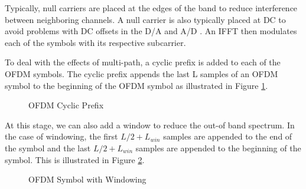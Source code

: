 \documentclass[conference]{IEEEtran}
\begin{document}
		Typically, null carriers are placed at the edges of the band to reduce interference between neighboring channels. A null carrier is also typically placed at DC to avoid problems with DC offsets in the D/A and A/D \cite{802_11a_standard}. An IFFT then modulates each of the symbols with its respective subcarrier.
		
		To deal with the effects of multi-path, a cyclic prefix is added to each of the OFDM symbols. The cyclic prefix appends the last L samples of an OFDM symbol to the beginning of the OFDM symbol as illustrated in Figure \ref{fig::cylic_prefix}.
		
		\begin{figure}[H]
	    		\centering
	    		\caption{OFDM Cyclic Prefix}
	    		\label{fig::cylic_prefix}
		\end{figure}
		
		At this stage, we can also add a window to reduce the out-of band spectrum. In the case of windowing, the first \newline $L/2 + L_{win}$ samples are appended to the end of the symbol and the last $L/2 + L_{win}$ samples are appended to the beginning of the symbol. This is illustrated in Figure \ref{fig::ofdm_windowing}.
		
		\begin{figure}[H]
	    		\centering
	    		\caption{OFDM Symbol with Windowing}
	    		\label{fig::ofdm_windowing}
		\end{figure}
		
\end{document}
